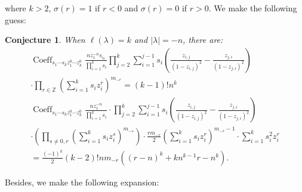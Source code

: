 \documentclass{article}
\newtheorem{conj}{Conjecture}[theorem]
\newcommand{\lr}[1]{\left({#1}\right)}
\DeclareMathOperator{\Coeff}{Coeff}
\begin{document}
where $k>2$, $\sigma(r) = 1$ if $r<0$ and $\sigma(r) = 0$ if $r>0$.
We make the following guess:
\begin{conj}
When $\ell(\lambda) = k$ and $|\lambda| = -n$, there are:
\begin{gather*}
\Coeff_{s_1 \cdots s_{k} z_1^{0} \cdots z^0_{k} } \frac{n z_1^{-n}s_{i_0}}{\prod_{i=1}^k s_i} \prod_{j=2}^k \sum_{i=1}^{j-1} s_i \left( \frac{z_{i,j}}{(1 - z_{i,j})^2} - \frac{z_{j,i}}{(1 - z_{j,i})^2} \right)\\\cdot\prod_{r\in\mathbb{Z}}\lr{\sum_{i=1}^k s_i z_i^r}^{m_{-r}}=(k-1)!n^k\\
\Coeff_{s_1 \cdots s_{k} z_1^{0} \cdots z^0_{k} } \frac{n z_1^{-n}}{\prod_{i=1}^k s_i}\cdot\prod_{j=2}^k \sum_{i=1}^{j-1} s_i \left( \frac{z_{i,j}}{(1 - z_{i,j})^2} - \frac{z_{j,i}}{(1 - z_{j,i})^2} \right)\\
\cdot
\lr{
\prod_{s\neq0,r} \lr{\sum_{i=1}^k s_i z_i^s}^{m_{-s}}} \cdot
\frac{r m_{-r}}{2} \lr{\sum_{i=1}^k s_i z_i^{r} }^{m_{-r} - 1}\cdot\sum_{i=1}^k s_i^2 z_i^{r} \\
= \frac{(-1)^k}{2}(k-2)!nm_{-r}\lr{(r-n)^k + kn^{k-1}r -n^k}.
\end{gather*}
\end{conj}
Besides, we make the following expansion:
\end{document}
